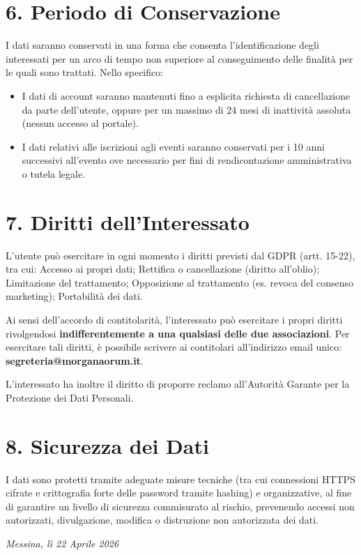 \documentclass[a4paper,11pt]{article}
\begin{document}
\section*{6. Periodo di Conservazione}

I dati saranno conservati in una forma che consenta l'identificazione degli interessati per un arco di tempo non superiore al conseguimento delle finalità per le quali sono trattati. Nello specifico:
\begin{itemize}[leftmargin=*]
    \item I dati di account saranno mantenuti fino a esplicita richiesta di cancellazione da parte dell'utente, oppure per un massimo di 24 mesi di inattività assoluta (nessun accesso al portale).
    \item I dati relativi alle iscrizioni agli eventi saranno conservati per i 10 anni successivi all'evento ove necessario per fini di rendicontazione amministrativa o tutela legale.
\end{itemize}

\section*{7. Diritti dell’Interessato}

L’utente può esercitare in ogni momento i diritti previsti dal GDPR (artt. 15-22), tra cui: Accesso ai propri dati; Rettifica o cancellazione (diritto all’oblio); Limitazione del trattamento; Opposizione al trattamento (es. revoca del consenso marketing); Portabilità dei dati.

Ai sensi dell'accordo di contitolarità, l'interessato può esercitare i propri diritti rivolgendosi \textbf{indifferentemente a una qualsiasi delle due associazioni}. Per esercitare tali diritti, è possibile scrivere ai contitolari all'indirizzo email unico: \textbf{segreteria@morganaorum.it}.

L’interessato ha inoltre il diritto di proporre reclamo all'Autorità Garante per la Protezione dei Dati Personali.

\section*{8. Sicurezza dei Dati}

I dati sono protetti tramite adeguate misure tecniche (tra cui connessioni HTTPS cifrate e crittografia forte delle password tramite hashing) e organizzative, al fine di garantire un livello di sicurezza commisurato al rischio, prevenendo accessi non autorizzati, divulgazione, modifica o distruzione non autorizzata dei dati.

\vspace{1cm}

\textit{Messina, lì 22 Aprile 2026}
\end{document}
